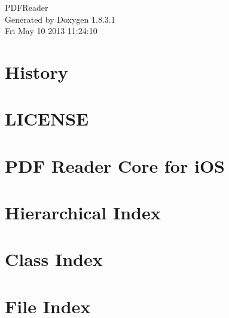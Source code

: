 \documentclass{book}
\begin{document}
\hypersetup{pageanchor=false,citecolor=blue}
\begin{titlepage}
\vspace*{7cm}
\begin{center}
{\Large P\-D\-F\-Reader }\\
\vspace*{1cm}
{\large Generated by Doxygen 1.8.3.1}\\
\vspace*{0.5cm}
{\small Fri May 10 2013 11:24:10}\\
\end{center}
\end{titlepage}
\clearemptydoublepage
{}
\tableofcontents
\clearemptydoublepage
{}
\hypersetup{pageanchor=true,citecolor=blue}
\chapter{History}
\label{md_HISTORY}
\hypertarget{md_HISTORY}{}

\chapter{L\-I\-C\-E\-N\-S\-E}
\label{md_LICENSE}
\hypertarget{md_LICENSE}{}

\chapter{P\-D\-F Reader Core for i\-O\-S}
\label{md_README}
\hypertarget{md_README}{}

\chapter{Hierarchical Index}

\chapter{Class Index}

\chapter{File Index}

\end{document}

